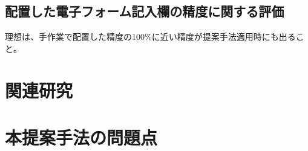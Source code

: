 \subsection{配置した電子フォーム記入欄の精度に関する評価}\label{subsec:evalue_accuracy}
理想は、手作業で配置した精度の100\%に近い精度が提案手法適用時にも出ること。



\section{関連研究}\label{sec:relation_research}



\section{本提案手法の問題点}\label{sec:AWSEL_problems}